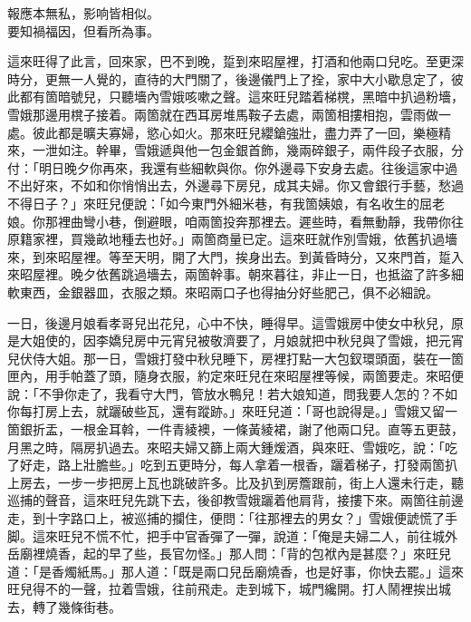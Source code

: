 \begin{myquote}
報應本無私，影响皆相似。\\要知禍福因，但看所為事。
\end{myquote}

這來旺得了此言，回來家，巴不到晚，踅到來昭屋裡，打酒和他兩口兒吃。至更深時分，更無一人覺的，直待的大門關了，後邊儀門上了拴，家中大小歇息定了，彼此都有箇暗號兒，只聽墻內雪娥咳嗽之聲。這來旺兒踏着梯櫈，黑暗中扒過粉墻，雪娥那邊用櫈子接着。兩箇就在西耳房堆馬鞍子去處，兩箇相摟相抱，雲雨做一處。彼此都是曠夫寡婦，慾心如火。那來旺兒纓鎗強壯，盡力弄了一回，樂極精來，一泄如注。幹畢，雪娥遞與他一包金銀首飾，幾兩碎銀子，兩件段子衣服，分付：「明日晚夕你再來，我還有些細軟與你。你外邊尋下安身去處。往後這家中過不出好來，不如和你悄悄出去，外邊尋下房兒，成其夫婦。你又會銀行手藝，愁過不得日子？」{}來旺兒便說：「如今東門外細米巷，有我箇姨娘，有名收生的屈老娘。你那裡曲彎小巷，倒避眼，咱兩箇投奔那裡去。遲些時，看無動靜，我帶你往原籍家裡，買幾畝地種去也好。」兩箇商量已定。這來旺就作別雪娥，依舊扒過墻來，到來昭屋裡。等至天明，開了大門，挨身出去。到黃昏時分，又來門首，踅入來昭屋裡。晚夕依舊跳過墻去，兩箇幹事。朝來暮往，非止一日，也抵盜了許多細軟東西，金銀器皿，衣服之類。來昭兩口子也得抽分好些肥己，俱不必細說。

一日，後邊月娘看孝哥兒出花兒，心中不快，睡得早。這雪娥房中使女中秋兒，原是大姐使的，因李嬌兒房中元宵兒被敬濟要了，月娘就把中秋兒與了雪娥，把元宵兒伏侍大姐。那一日，雪娥打發中秋兒睡下，房裡打點一大包釵環頭面，裝在一箇匣內，用手帕蓋了頭，隨身衣服，約定來旺兒在來昭屋裡等候，兩箇要走。來昭便說：「不爭你走了，我看守大門，管放水鴨兒！若大娘知道，問我要人怎的？不如你每打房上去，就躧破些瓦，還有蹤跡。」來旺兒道：「哥也說得是。」雪娥又留一箇銀折盂，一根金耳斡，一件青綾襖，一條黃綾裙，謝了他兩口兒。直等五更鼓，月黑之時，隔房扒過去。來昭夫婦又篩上兩大鍾煖酒，與來旺、雪娥吃，說：「吃了好走，路上壯膽些。」吃到五更時分，每人拿着一根香，躧着梯子，打發兩箇扒上房去，一步一步把房上瓦也跳破許多。比及扒到房簷跟前，街上人還未行走，聽巡捕的聲音，這來旺兒先跳下去，後卻教雪娥躧着他肩背，接摟下來。兩箇往前邊走，到十字路口上，被巡捕的攔住，{}便問：「往那裡去的男女？」雪娥便諕慌了手脚。這來旺兒不慌不忙，把手中官香彈了一彈，說道：「俺是夫婦二人，前往城外岳廟裡燒香，起的早了些，長官勿怪。」那人問：「背的包袱內是甚麼？」來旺兒道：「是香燭紙馬。」那人道：「既是兩口兒岳廟燒香，也是好事，你快去罷。」這來旺兒得不的一聲，拉着雪娥，往前飛走。走到城下，城門纔開。打人鬧裡挨出城去，轉了幾條街巷。

